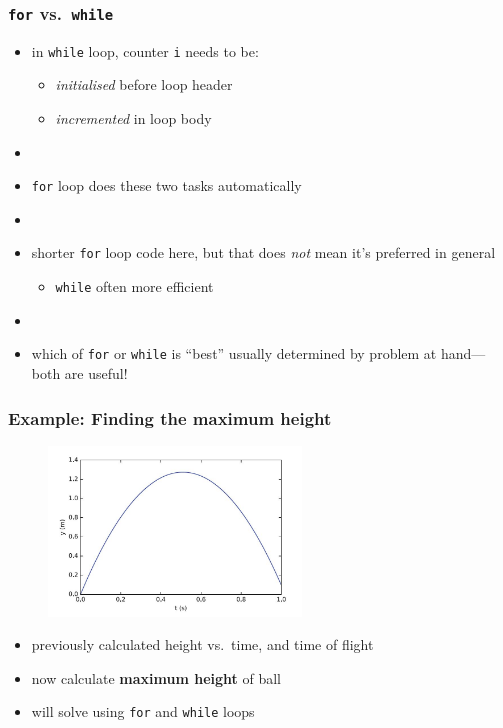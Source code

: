 \documentclass[english,14pt]{beamer}
\newcommand\red[1]{{\color{red} #1}}
\begin{document}

\begin{frame}[fragile]

\frametitle{ \texttt{for} vs.~\texttt{while}}

\begin{itemize}
	\item in \texttt{while} loop, counter \texttt{i} needs to be:
	\begin{itemize}
		\item \red{\emph{initialised}} before loop header
		\item \red{\emph{incremented}} in loop body
	\end{itemize}
	\item[]
	\item \texttt{for} loop does these two tasks automatically
	\item[]
	\item shorter \texttt{for} loop code here, but that does \emph{not} mean it's preferred in general
	\begin{itemize}
		\item \texttt{while} often more efficient
	\end{itemize}
	\item[]	
	\item which of \texttt{for} or \texttt{while} is ``best'' usually determined by problem at hand---both are useful!
\end{itemize}

\end{frame}


\begin{frame}[fragile]

\frametitle{Example: Finding the maximum height}

\vspace*{-3mm}
\begin{figure}[ht]
	\centering
	\includegraphics[width=0.6\textwidth]{figures/LLp20c}
\end{figure}
\vspace*{-3mm}
\begin{itemize}
	\item previously calculated height vs.\ time, and time of flight
	\item now calculate \textbf{maximum height} of ball
	\item will solve using \texttt{for} and \texttt{while} loops
\end{itemize}

\end{frame}
\end{document}
